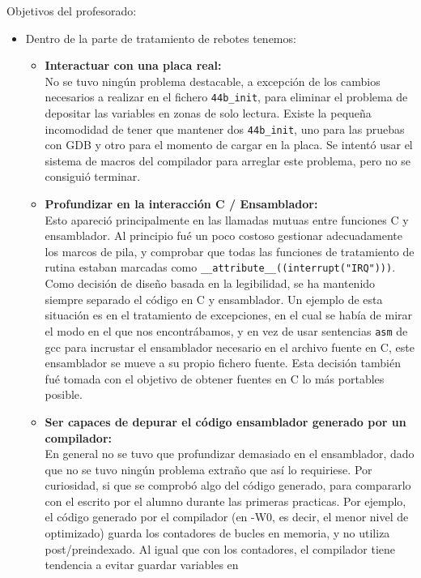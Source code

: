 \documentclass[12pt,letterpaper]{article}
\begin{document}
Objetivos del profesorado:
\begin{itemize}
\item Dentro de la parte de tratamiento de rebotes tenemos:
  \begin{itemize}
  \item \textbf{Interactuar con una placa real:}\\ No se tuvo ningún
    problema destacable, a excepción de los cambios necesarios a
    realizar en el fichero \texttt{44b\_init}, para eliminar el
    problema de depositar las variables en zonas de solo
    lectura. Existe la pequeña incomodidad de tener que mantener dos
    \texttt{44b\_init}, uno para las pruebas con GDB y otro para el
    momento de cargar en la placa. Se intentó usar el sistema de
    macros del compilador para arreglar este problema, pero no se
    consiguió terminar.
  \item \textbf{Profundizar en la interacción C / Ensamblador:}\\ Esto
    apareció principalmente en las llamadas mutuas entre funciones C y
    ensamblador. Al principio fué un poco costoso gestionar
    adecuadamente los marcos de pila, y comprobar que todas las
    funciones de tratamiento de rutina estaban marcadas como
    \texttt{\_\_attribute\_\_((interrupt("IRQ")))}. Como decisión de
    diseño basada en la legibilidad, se ha mantenido siempre separado
    el código en C y ensamblador. Un ejemplo de esta situación es en
    el tratamiento de excepciones, en el cual se había de mirar el
    modo en el que nos encontrábamos, y en vez de usar sentencias
    \texttt{asm} de gcc para incrustar el ensamblador necesario en el
    archivo fuente en C, este ensamblador se mueve a su propio fichero
    fuente. Esta decisión también fué tomada con el objetivo de
    obtener fuentes en C lo más portables posible.
  \item \textbf{Ser capaces de depurar el código ensamblador generado
    por un compilador:}\\ En general no se tuvo que profundizar
    demasiado en el ensamblador, dado que no se tuvo ningún problema
    extraño que así lo requiriese. Por curiosidad, si que se comprobó
    algo del código generado, para compararlo con el escrito por el
    alumno durante las primeras practicas. Por ejemplo, el código
    generado por el compilador (en -W0, es decir, el menor nivel de
    optimizado) guarda los contadores de bucles en memoria, y no
    utiliza post/preindexado. Al igual que con los contadores, el
    compilador tiene tendencia a evitar guardar variables en

\end{itemize}
\end{itemize}
\end{document}

